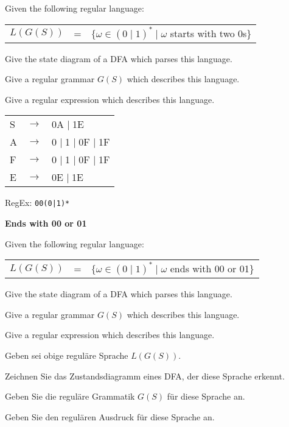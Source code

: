 \documentclass[a4paper]{exam}
\theoremstyle{remark}
\newenvironment{grammar}
	{\begin{tabular}[b]{lcl}}
	{\end{tabular}}
\newcommand{\rewritten}{$\to$}
\newcommand{\alternative}{$\mid \;$}
\begin{document}
\begin{questions}
	Given the following regular language:
	
	\begin{tabular}[b]{lcl}
		$L(G(S))$ & = & $\{\omega \in (0 \mid 1)^* \mid \omega$ starts with two 0s\}
	\end{tabular}

	\begin{parts}
		\item Give the state diagram of a DFA which parses this language.
		\item Give a regular grammar $G(S)$ which describes this language.
		\item Give a regular expression which describes this language.
	\end{parts}

	\begin{solution}
		
		\begin{grammar}
			S &\rewritten & 0A \alternative 1E \\
			A &\rewritten & 0 \alternative 1 \alternative 0F \alternative 1F \\
			F &\rewritten & 0 \alternative 1 \alternative 0F \alternative 1F \\
			E &\rewritten & 0E \alternative 1E
		\end{grammar}
		
		RegEx: {\tt 00(0|1)*}
		
	\end{solution}
	
\question
	\textbf{Ends with 00 or 01}

	Given the following regular language:
	\begin{tabular}[b]{lcl}
		$L(G(S))$ & = & $\{\omega \in (0 \mid 1)^* \mid \omega$ ends with 00 or 01\}
	\end{tabular}

	\begin{parts}
		\item Give the state diagram of a DFA which parses this language.
		\item Give a regular grammar $G(S)$ which describes this language.
		\item Give a regular expression which describes this language.
	\end{parts}
	
	\begin{otherlanguage}{german}
		Geben sei obige reguläre Sprache $L(G(S))$.
		
		\begin{parts}
			\item Zeichnen Sie das Zustandsdiagramm eines DFA, der diese Sprache erkennt.
			\item Geben Sie die reguläre Grammatik $G(S)$ für diese Sprache an.
			\item Geben Sie den regulären Ausdruck für diese Sprache an.
		\end{parts}
	\end{otherlanguage}


\end{questions}
\end{document}
